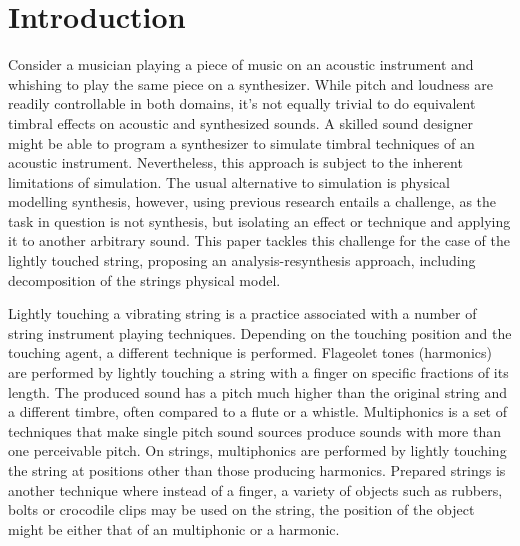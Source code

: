 \documentclass{sigchi}
\def\plainkeywords{physical modelling; audio features}
\begin{document}

\keywords{\plainkeywords}

\printccsdesc

\section{Introduction}


Consider a musician playing a piece of music on an acoustic instrument and whishing to play the same piece on a synthesizer.
While pitch and loudness are readily controllable in both domains, it's not equally trivial to do equivalent timbral effects on acoustic and synthesized sounds.
A skilled sound designer might be able to program a synthesizer to simulate timbral techniques of an acoustic instrument.
Nevertheless, this approach is subject to the inherent limitations of simulation.
The usual alternative to simulation is physical modelling synthesis, however, using previous research entails a challenge, as the task in question is not synthesis, but isolating an effect or technique and applying it to another arbitrary sound.
This paper tackles this challenge for the case of the lightly touched string, proposing an analysis-resynthesis approach, including decomposition of the strings physical model.

Lightly touching a vibrating string is a practice associated with a number of string instrument playing techniques.
Depending on the touching position and the touching agent, a different technique is performed.
Flageolet tones (harmonics) are performed by lightly touching a string with a finger on specific fractions of its length.
The produced sound has a pitch much higher than the original string and a different timbre, often compared to a flute or a whistle.
Multiphonics is a set of techniques that make single pitch sound sources produce sounds with more than one perceivable pitch.
On strings, multiphonics are performed by lightly touching the string at positions other than those producing harmonics.
Prepared strings is another technique where instead of a finger, a variety of objects such as rubbers, bolts or crocodile clips may be used on the string, the position of the object might be either that of an multiphonic or a harmonic.
\end{document}
